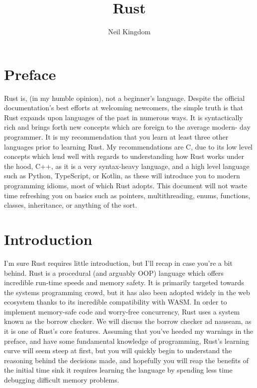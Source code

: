 \documentclass{article}
\title{Rust}
\author{Neil Kingdom}
\begin{document}
\maketitle

\newpage

\tableofcontents

\newpage

\section{Preface}	

Rust is, (in my humble opinion), not a beginner's language. Despite the official documentation’s 
best efforts at welcoming newcomers, the simple truth is that Rust expands upon languages of the past in 
numerous ways. It is syntactically rich and brings forth new concepts which are foreign to the average modern-
day programmer. It is my recommendation that you learn at least three other languages prior to learning Rust. 
My recommendations are C, due to its low level concepts which lend well with regards to understanding how Rust 
works under the hood, C++, as it is a very syntax-heavy language, and a high 
level language such as Python, TypeScript, or Kotlin, as these will introduce you to modern programming idioms, 
most of which Rust adopts. This document will not waste time refreshing you on basics such as pointers, 
multithreading, enums, functions, classes, inheritance, or anything of the sort. 

\section{Introduction}

I’m sure Rust requires little introduction, but I’ll recap in case you’re a 
bit behind. Rust is a procedural (and arguably OOP) language which offers incredible run-time speeds 
and memory safety. It is primarily targeted towards the systems programming crowd, but it has also been adopted 
widely in the web ecosystem thanks to its incredible compatibility with WASM. In order to implement memory-safe 
code and worry-free concurrency, Rust uses a system known as the borrow checker. We will discuss 
the borrow checker ad nauseam, as it is one of Rust’s core features. Assuming that you’ve heeded my 
warnings in the preface, and have some fundamental knowledge of programming, Rust’s 
learning curve will seem steep at first, but you will quickly begin to understand the reasoning behind the 
decisions made, and hopefully you will reap the benefits of the initial time sink it requires learning the 
language by spending less time debugging difficult memory problems.
\end{document}
